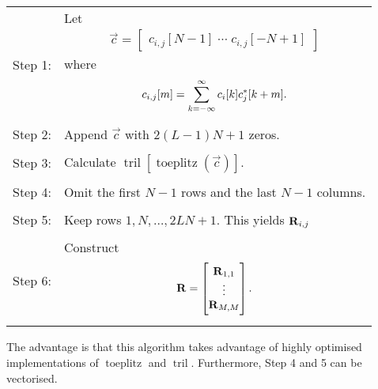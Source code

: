 \documentclass[a4paper, openany, oneside]{memoir}
\begin{document}
\begin{tabularx}{\textwidth}{rY}
    Step 1: & Let \begin{align*}
                \vec{c} = \begin{bmatrix} c_{i,j}[N-1] \; \cdots \; c_{i,j}[-N+1] \end{bmatrix}
\end{align*} where \begin{align*}
                c_{i,j}[m] = \sum_{k=-\infty}^{\infty}c_i[k] c^*_j[k+m].
            \end{align*} \\
    Step 2: & Append $\vec{c}$ with $2(L-1)N+1$ zeros. \\ \\
    Step 3: & Calculate $\operatorname{tril}[\operatorname{toeplitz}(\vec{c})]$. \\ \\
    Step 4: & Omit the first $N-1$ rows and the last $N-1$ columns. \\ \\
    Step 5: & Keep rows $1,N,\ldots,2LN+1$. This yields $\boldsymbol{\mathbf{R}}_{i,j}$ \\ \\
    Step 6: & Construct \begin{align*}
        \boldsymbol{\mathbf{R}} = \begin{bmatrix}
            \boldsymbol{\mathbf{R}}_{1,1} \\ \vdots \\ \boldsymbol{\mathbf{R}}_{M,M}
        \end{bmatrix}.
    \end{align*} \\
\end{tabularx}

The advantage is that this algorithm takes advantage of highly optimised implementations of $\operatorname{toeplitz}$ and $\operatorname{tril}$. Furthermore, Step 4 and 5 can be vectorised.
\end{document}
